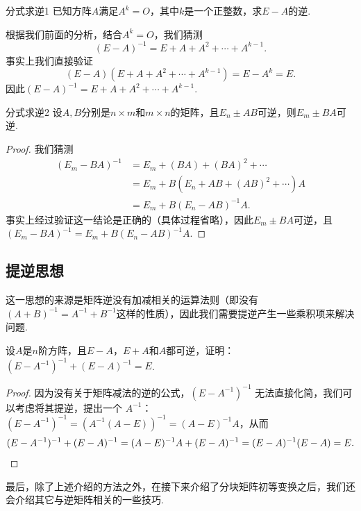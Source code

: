 \begin{example}{}{分式求逆1}
    已知方阵$A$满足$A^k=O$，其中$k$是一个正整数，求$E-A$的逆.
\end{example}

\begin{solution}
    根据我们前面的分析，结合$A^k=O$，我们猜测
    \[(E-A)^{-1}=E+A+A^2+\cdots+A^{k-1}.\]
    事实上我们直接验证
    \[(E-A)(E+A+A^2+\cdots+A^{k-1})=E-A^k=E.\]
    因此$(E-A)^{-1}=E+A+A^2+\cdots+A^{k-1}$.
\end{solution}

\begin{example}{}{分式求逆2}
    设$A,B$分别是$n \times m$和$m \times n$的矩阵，且$E_n \pm AB$可逆，则$E_m \pm BA$可逆.
\end{example}

\begin{proof}
    我们猜测
    \begin{align*}
        (E_m-BA)^{-1} & =E_m+(BA)+(BA)^2+\cdots       \\
                      & =E_m+B(E_n+AB+(AB)^2+\cdots)A \\
                      & =E_m+B(E_n-AB)^{-1}A.
    \end{align*}
    事实上经过验证这一结论是正确的（具体过程省略），因此$E_m \pm BA$可逆，且$(E_m-BA)^{-1}=E_m+B(E_n-AB)^{-1}A$.
\end{proof}

\subsection{提逆思想}

这一思想的来源是矩阵逆没有加减相关的运算法则（即没有$(A+B)^{-1}=A^{-1}+B^{-1}$这样的性质），因此我们需要提逆产生一些乘积项来解决问题.
\begin{example}{}{}
    设$A$是$n$阶方阵，且$E-A$，$E+A$和$A$都可逆，证明：$(E-A^{-1})^{-1}+(E-A)^{-1}=E$.
\end{example}

\begin{proof}
    因为没有关于矩阵减法的逆的公式，$(E - A^{-1})^{-1}$ 无法直接化简，我们可以考虑将其提逆，提出一个 $A^{-1}$：$(E-A^{-1})^{-1} = (A^{-1}(A-E))^{-1} = (A-E)^{-1}A$，从而
    \[(E-A^{-1})^{-1}+(E-A)^{-1}=(A-E)^{-1}A+(E-A)^{-1}=(E-A)^{-1}(E-A)=E. \qedhere\]
\end{proof}

最后，除了上述介绍的方法之外，在接下来介绍了分块矩阵初等变换之后，我们还会介绍其它与逆矩阵相关的一些技巧.

